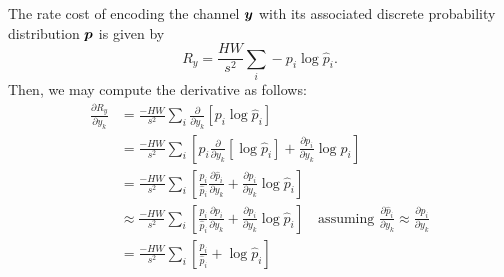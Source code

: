The rate cost of encoding the channel ${\boldsymbol{y}}$ with its associated discrete probability distribution ${\boldsymbol{p}}$ is given by
%
\begin{equation*}
  R_y = \frac{H W}{s^2} \sum_i -p_i \log \hat{p}_i.
\end{equation*}
%
Then, we may compute the derivative as follows:
%
\begin{equation}
  \label{eq:pdf_compression/optimization/dRdy_proposed}
  \begin{split}
    \frac{\partial R_y}{\partial y_k}
    &= \frac{-H W}{s^2} \sum_i \frac{\partial}{\partial y_k} \left[ p_i \log \hat{p}_i \right]
    \\
    &= \frac{-H W}{s^2} \sum_i \left[
      p_i \frac{\partial}{\partial y_k} \left[ \log \hat{p}_i \right]
      + \frac{\partial p_i}{\partial y_k} \log \hat{p}_i
    \right]
    \\
    &= \frac{-H W}{s^2} \sum_i \left[
      \frac{p_i}{\hat{p}_i} \frac{\partial \hat{p}_i}{\partial y_k}
      + \frac{\partial p_i}{\partial y_k} \log \hat{p}_i
    \right]
    \\
    &\approx \frac{-H W}{s^2} \sum_i \left[
      \frac{p_i}{\hat{p}_i} \frac{\partial p_i}{\partial y_k}
      + \frac{\partial p_i}{\partial y_k} \log \hat{p}_i
    \right]
    \quad \text{assuming } \frac{\partial \hat{p}_i}{\partial y_k} \approx \frac{\partial p_i}{\partial y_k}
    \\
    &= \frac{-H W}{s^2} \sum_i
      \left[ \frac{p_i}{\hat{p}_i} + \log \hat{p}_i \right]

\end{split}
\end{equation}
